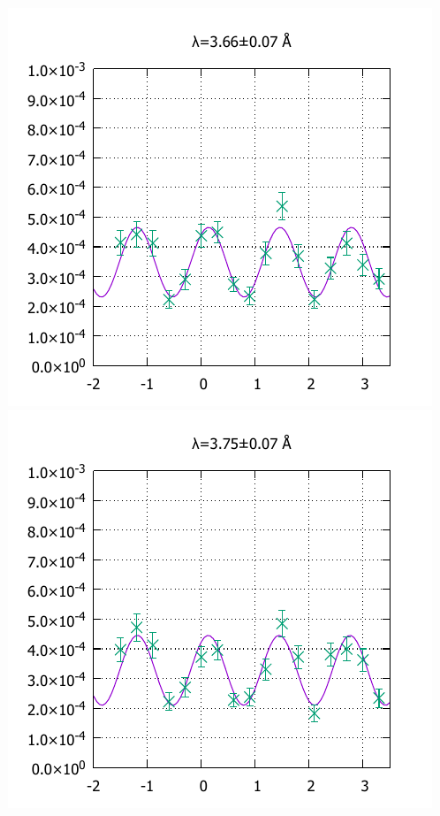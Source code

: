 \begin{figure}[H]
\begin{minipage}{0.33\hsize}
\includegraphics[width=\imgwidth]{phase_shifter/wl/wlf11.pdf}
\end{minipage}
\begin{minipage}{0.33\hsize}
\includegraphics[width=\imgwidth]{phase_shifter/wl/wlf6.pdf}
\end{minipage}
\begin{minipage}{0.33\hsize}

\end{minipage}
\end{figure}

